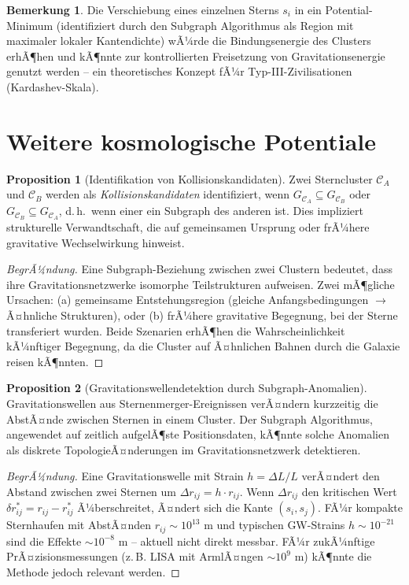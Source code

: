 ﻿\documentclass[a4paper,12pt]{report}
\theoremstyle{definition}
\newtheorem{bemerkung}{Bemerkung}
\newtheorem{proposition}{Proposition}
\begin{document}
\begin{bemerkung}
Die Verschiebung eines einzelnen Sterns $s_i$ in ein Potential-Minimum (identifiziert durch den Subgraph Algorithmus als Region mit maximaler lokaler Kantendichte) wÃ¼rde die Bindungsenergie des Clusters erhÃ¶hen und kÃ¶nnte zur kontrollierten Freisetzung von Gravitationsenergie genutzt werden -- ein theoretisches Konzept fÃ¼r Typ-III-Zivilisationen (Kardashev-Skala).
\end{bemerkung}

\section{Weitere kosmologische Potentiale}

\begin{proposition}[Identifikation von Kollisionskandidaten]
Zwei Sterncluster $\mathcal{C}_A$ und $\mathcal{C}_B$ werden als \emph{Kollisionskandidaten} identifiziert, wenn $G_{\mathcal{C}_A} \subseteq G_{\mathcal{C}_B}$ oder $G_{\mathcal{C}_B} \subseteq G_{\mathcal{C}_A}$, d.\,h.\ wenn einer ein Subgraph des anderen ist. Dies impliziert strukturelle Verwandtschaft, die auf gemeinsamen Ursprung oder frÃ¼here gravitative Wechselwirkung hinweist.
\end{proposition}

\begin{proof}[BegrÃ¼ndung]
Eine Subgraph-Beziehung zwischen zwei Clustern bedeutet, dass ihre Gravitationsnetzwerke isomorphe Teilstrukturen aufweisen. Zwei mÃ¶gliche Ursachen: (a) gemeinsame Entstehungsregion (gleiche Anfangsbedingungen $\to$ Ã¤hnliche Strukturen), oder (b) frÃ¼here gravitative Begegnung, bei der Sterne transferiert wurden. Beide Szenarien erhÃ¶hen die Wahrscheinlichkeit kÃ¼nftiger Begegnung, da die Cluster auf Ã¤hnlichen Bahnen durch die Galaxie reisen kÃ¶nnten.
\end{proof}

\begin{proposition}[Gravitationswellendetektion durch Subgraph-Anomalien]
Gravitationswellen aus Sternenmerger-Ereignissen verÃ¤ndern kurzzeitig die AbstÃ¤nde zwischen Sternen in einem Cluster. Der Subgraph Algorithmus, angewendet auf zeitlich aufgelÃ¶ste Positionsdaten, kÃ¶nnte solche Anomalien als diskrete TopologieÃ¤nderungen im Gravitationsnetzwerk detektieren.
\end{proposition}

\begin{proof}[BegrÃ¼ndung]
Eine Gravitationswelle mit Strain $h = \Delta L / L$ verÃ¤ndert den Abstand zwischen zwei Sternen um $\Delta r_{ij} = h \cdot r_{ij}$. Wenn $\Delta r_{ij}$ den kritischen Wert $\delta r_{ij}^* = r_{ij} - r_{ij}^*$ Ã¼berschreitet, Ã¤ndert sich die Kante $(s_i, s_j)$. FÃ¼r kompakte Sternhaufen mit AbstÃ¤nden $r_{ij} \sim 10^{13}$ m und typischen GW-Strains $h \sim 10^{-21}$ sind die Effekte $\sim 10^{-8}$ m -- aktuell nicht direkt messbar. FÃ¼r zukÃ¼nftige PrÃ¤zisionsmessungen (z.\,B. LISA mit ArmlÃ¤ngen $\sim 10^9$ m) kÃ¶nnte die Methode jedoch relevant werden.
\end{proof}
\end{document}

